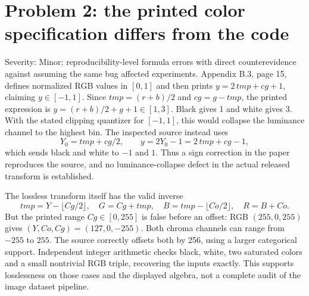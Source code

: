 \documentclass[10pt]{article}
\begin{document}
\section*{Problem 2: the printed color specification differs from the code}
Severity: Minor; reproducibility-level formula errors with direct counterevidence against assuming the same bug affected experiments. Appendix B.3, page 15, defines normalized RGB values in \([0,1]\) and then prints \(y=2\,tmp+cg+1\), claiming \(y\in[-1,1]\). Since \(tmp=(r+b)/2\) and \(cg=g-tmp\), the printed expression is \(y=(r+b)/2+g+1\in[1,3]\). Black gives 1 and white gives 3. With the stated clipping quantizer for \([-1,1]\), this would collapse the luminance channel to the highest bin. The inspected source instead uses \[Y_0=tmp+cg/2,\qquad y=2Y_0-1=2\,tmp+cg-1,\] which sends black and white to \(-1\) and \(1\). Thus a sign correction in the paper reproduces the source, and no luminance-collapse defect in the actual released transform is established.\par
The lossless transform itself has the valid inverse \[tmp=Y-\lfloor Cg/2\rfloor,\quad
 G=Cg+tmp,\quad B=tmp-\lfloor Co/2\rfloor,\quad R=B+Co.\] But the printed range \(Cg\in[0,255]\) is false before an offset: RGB \((255,0,255)\) gives \((Y,Co,Cg)=(127,0,-255)\). Both chroma channels can range from \(-255\) to \(255\). The source correctly offsets both by 256, using a larger categorical support. Independent integer arithmetic checks black, white, two saturated colors and a small nontrivial RGB triple, recovering the inputs exactly. This supports losslessness on those cases and the displayed algebra, not a complete audit of the image dataset pipeline.\par
\end{document}
